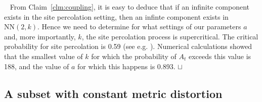 \documentclass[11pt]{article}
\newcommand{\sq}{\hbox{\rlap{$\sqcap$}$\sqcup$}}
\newcommand{\qed}{\hspace*{\fill}\sq}
\newenvironment{proof}{\noindent {\bf Proof.}\ }{\qed\par\vskip 4mm\par}
\def\NN{\mbox{NN}}
\begin{document}
\begin{proof}
From Claim~\ref{clm:coupling}, it is easy to deduce that if an
infinite component exists in the site percolation setting, then an
infinte component exists in $\NN(2,k)$. Hence we need to determine for
what settings of our parameters $a$ and, more importantly, $k$, the
site percolation process is supercritical.  The critical probability
for site percolation is 0.59 (see
e.g. \cite{lee-arxiv:2007}). Numerical calculations showed that the
smallest value of $k$ for which the probability of $A_t$ exceeds this
value is 188, and the value of $a$ for which this happens is 0.893.
\end{proof}

\subsection{A subset with constant metric distortion}
\label{sec:metric:subset}
\end{document}

